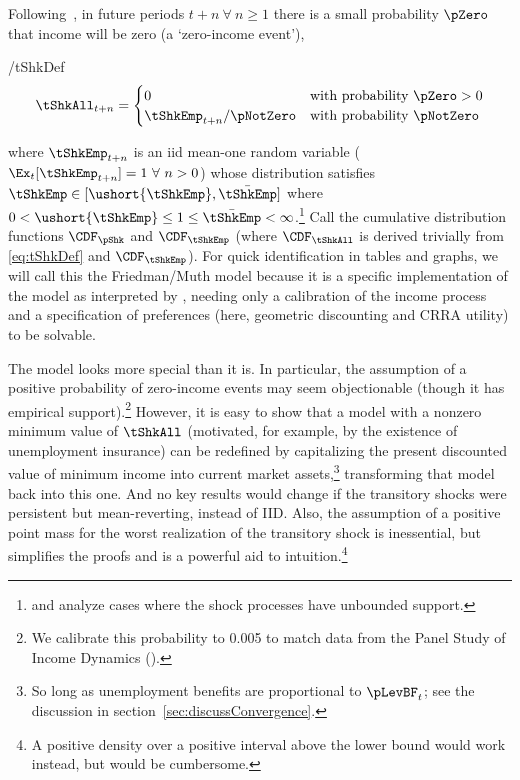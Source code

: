 \documentclass[BufferStockTheory]{subfiles}
\begin{document}
Following~\cite{zeldesStochastic}, in future periods $t+n ~\forall~ n \geq 1$ there is a small probability $\pZero$ that income will be zero (a `zero-income event'),
\begin{verbatimwrite}{\EqDir/tShkDef}
  \begin{equation}
    \tShkAll _{t+n}=
    \begin{cases}
      0\phantom{_{t+1}/\pNotZero} & \text{with probability $\pZero>0$} \\
      \tShkEmp_{t+n}/\pNotZero      & \text{with probability $\pNotZero  $} %
    \end{cases} \label{eq:tShkDef}
  \end{equation}
\end{verbatimwrite}

where $\tShkEmp_{t+n}$ is an iid mean-one random variable
($\Ex_{t}[{\tShkEmp}_{t+n}]=1~\forall~n>0$)
whose distribution satisfies $\tShkEmp \in \lbrack \ushort{\tShkEmp},\bar{\tShkEmp}\rbrack$
where $0<\ushort{\tShkEmp} \leq 1 \leq \bar{\tShkEmp}<\infty$.\footnote{\cite{rabaultBorrowing} and \cite{lsIncFluct} analyze cases where the shock processes have unbounded support.}  Call the cumulative
distribution functions $\CDF_{\pShk}$ and $\CDF_{\tShkEmp}$ (where $\CDF_{\tShkAll}$
 is derived trivially from \eqref{eq:tShkDef} and $\CDF_{\tShkEmp}$).  For quick identification in tables and graphs, we will call this the Friedman/Muth model because it is a specific implementation of the \cite{friedmanATheory} model as interpreted by \cite{muthOptimal}, needing only a calibration of the income process and a specification of preferences (here, geometric discounting and CRRA utility) to be solvable.

\hypertarget{PDV}{}
The model looks more special than it is.  In particular, the
assumption of a positive probability of zero-income events may seem
objectionable (though it has empirical support).\footnote{We calibrate this probability to 0.005 to match data from the Panel Study of Income Dynamics (\cite{carrollBrookings}).}
However, it is easy to show that a model with a
nonzero minimum value of $\tShkAll$ (motivated, for example, by the
existence of unemployment insurance) can be redefined by capitalizing
the present discounted value of minimum income into current market assets,\footnote{So long
  as unemployment benefits are
  proportional to $\pLevBF_{t}$; see the discussion in
  section~\ref{sec:discussConvergence}.}  transforming
that model back into this one.  And no key results would change if the transitory shocks were persistent but mean-reverting, instead of IID.  Also, the assumption of a positive point mass for the worst realization of the transitory shock is inessential, but simplifies the proofs and is a powerful aid to intuition.\footnote{A  positive density over a positive interval above the lower bound would work instead, but would be cumbersome.}
\end{document}
